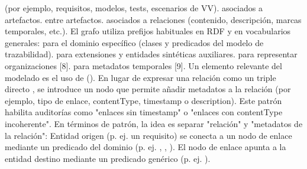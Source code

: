 {}\markdownRendererUlBeginTight
\markdownRendererUlItem {} (por ejemplo, requisitos, modelos, tests, escenarios de V\markdownRendererBackslash{}\markdownRendererAmpersand{}V).\markdownRendererUlItemEnd 
\markdownRendererUlItem {} asociados a artefactos.\markdownRendererUlItemEnd 
\markdownRendererUlItem {} entre artefactos.\markdownRendererUlItemEnd 
\markdownRendererUlItem {} asociados a relaciones (contenido, descripción, marcas temporales, etc.).\markdownRendererUlItemEnd 
\markdownRendererUlEndTight \markdownRendererInterblockSeparator
{}El grafo utiliza prefijos habituales en RDF y en vocabularios generales:\markdownRendererInterblockSeparator
{}\markdownRendererUlBeginTight
\markdownRendererUlItem {} para el dominio específico (clases y predicados del modelo de trazabilidad).\markdownRendererUlItemEnd 
\markdownRendererUlItem {} para extensiones y entidades sintéticas auxiliares.\markdownRendererUlItemEnd 
\markdownRendererUlItem {} para representar organizaciones [8].\markdownRendererUlItemEnd 
\markdownRendererUlItem {} para metadatos temporales [9].\markdownRendererUlItemEnd 
\markdownRendererUlEndTight \markdownRendererInterblockSeparator
{}Un elemento relevante del modelado es el uso de  (). En lugar de expresar una relación como un triple directo , se introduce un nodo  que permite añadir metadatos a la relación (por ejemplo, tipo de enlace, contentType, timestamp o description). Este patrón habilita auditorías como "enlaces sin timestamp" o "enlaces con contentType incoherente".\markdownRendererInterblockSeparator
{}En términos de patrón, la idea es separar "relación" y "metadatos de la relación":\markdownRendererInterblockSeparator
{}\markdownRendererUlBeginTight
\markdownRendererUlItem Entidad origen (p. ej. un requisito) se conecta a un nodo de enlace mediante un predicado del dominio (p. ej. , , ).\markdownRendererUlItemEnd 
\markdownRendererUlItem El nodo de enlace apunta a la entidad destino mediante un predicado genérico (p. ej. ).\markdownRendererUlItemEnd 
